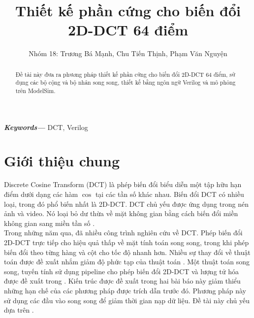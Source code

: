 \documentclass[conference]{IEEEtran}
\providecommand{\keywords}[1]
{
	\small	
	\textbf{\textit{Keywords---}} #1
}
\begin{document}
	\title{Thiết kế phần cứng cho biến đổi 2D-DCT 64 điểm}
	\author{Nhóm 18: Trương Bá Mạnh, Chu Tiến Thịnh, Phạm Văn Nguyện}
	\maketitle
	\begin{abstract}
		Đề tài này đưa ra phương pháp thiết kế phần cứng cho biến đổi 2D-DCT 64 điểm, sử dụng các bộ cộng và bộ nhân song song, thiết kế bằng ngôn ngữ Verilog và mô phỏng trên ModelSim.
	\end{abstract}
	\keywords{DCT, Verilog}
	\section{Giới thiệu chung}
	Discrete Cosine Transform (DCT) là phép biến đổi biểu diễn một tập hữu hạn điểm dưới dạng các hàm $\cos$ tại các tần số khác nhau. Biến đổi DCT có nhiều loại, trong đó phổ biến nhất là 2D-DCT. DCT chủ yếu được ứng dụng trong nén ảnh và video. Nó loại bỏ dư thừa về mặt không gian bằng cách biến đổi miền không gian sang miền tần số \cite{art1}.\\
	Trong những năm qua, đã nhiều công trình nghiên cứu về DCT. Phép biến đổi 2D-DCT trực tiếp \cite{art2} cho hiệu quả thấp về mặt tính toán song song, trong khi phép biến đổi theo từng hàng và cột \cite{art3}\cite{art4} cho tốc độ nhanh hơn. Nhiều sự thay đổi về thuật toán được đề xuất nhắm giảm độ phức tạp của thuật toán \cite{art5}\cite{art6}\cite{art7}. Một thuật toán song song, tuyến tính sử dụng pipeline cho phép biến đổi 2D-DCT và lượng tử hóa được đề xuất trong \cite{art8}\cite{art9}. Kiến trúc được đề xuất trong hai bài báo này giảm thiểu những hạn chế của các phương pháp được trích dẫn trước đó. Phương pháp này sử dụng các đầu vào song song để giảm thời gian nạp dữ liệu. Đề tài này chủ yếu dựa trên \cite{book1}. 
\end{document}
